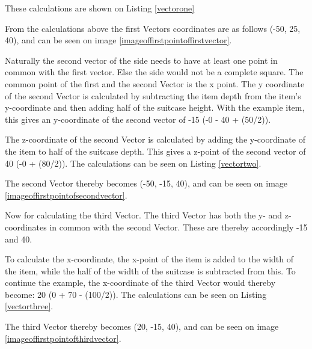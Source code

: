 These calculations are shown on Listing \ref{vectorone}


From the calculations above the first Vectors coordinates are as follows (-50, 25, 40), and can be seen on image \ref{imageoffirstpointoffirstvector}.

Naturally the second vector of the side needs to have at least one point in common with the first vector. Else the side would not be a complete square. 
The common point of the first and the second Vector is the x point. 
The y coordinate of the second Vector is calculated by subtracting the item depth from the item's y-coordinate and then adding half of the suitcase height. With the example item, this gives an y-coordinate of the second vector of -15 (-0 - 40 + (50/2)).

The z-coordinate of the second Vector is calculated by adding the y-coordinate of the item to half of the suitcase depth. This gives a z-point of the second vector of 40 (-0 + (80/2)). The calculations can be seen on Listing \ref{vectortwo}.


The second Vector thereby becomes (-50, -15, 40), and can be seen on image \ref{imageoffirstpointofsecondvector}.

Now for calculating the third Vector. The third Vector has both the y- and z- coordinates in common with the second Vector. These are thereby accordingly -15 and 40. 

To calculate the x-coordinate, the x-point of the item is added to the width of the item, while the half of the width of the suitcase is subtracted from this. To continue the example, the x-coordinate of the third Vector would thereby become: 20 (0 + 70 - (100/2)). The calculations can be seen on Listing \ref{vectorthree}.


The third Vector thereby becomes (20, -15, 40), and can be seen on image \ref{imageoffirstpointofthirdvector}.


